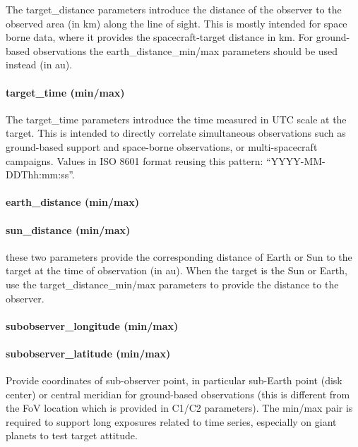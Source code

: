 \documentclass[11pt,a4paper]{ivoa}
\begin{document}
The target\_distance parameters introduce the distance of the observer to the observed area (in km) along the line of sight. This is mostly intended for space borne data, where it provides the spacecraft-target distance in km. For ground-based observations the earth\_distance\_min/max parameters should be used instead (in au).

\paragraph{target\_time (min/max)}

The target\_time parameters introduce the time measured in UTC scale at the target. This is intended to directly correlate simultaneous observations such as ground-based support and space-borne observations, or multi-spacecraft campaigns. Values in ISO 8601 format reusing this pattern: “YYYY-MM-DDThh:mm:ss”. 

\paragraph{earth\_distance (min/max)}

\paragraph{sun\_distance (min/max)}

these two parameters provide the corresponding distance of Earth or Sun to the target at the time of observation (in au). When the target is the Sun or Earth, use the target\_distance\_min/max parameters to provide the distance to the observer.

\paragraph{subobserver\_longitude (min/max)}

\paragraph{subobserver\_latitude (min/max)}

Provide coordinates of sub-observer point, in particular sub-Earth point (disk center) or central meridian for ground-based observations (this is different from the FoV location which is provided in C1/C2 parameters). The min/max pair is required to support long exposures related to time series, especially on giant planets to test target attitude.
\end{document}
